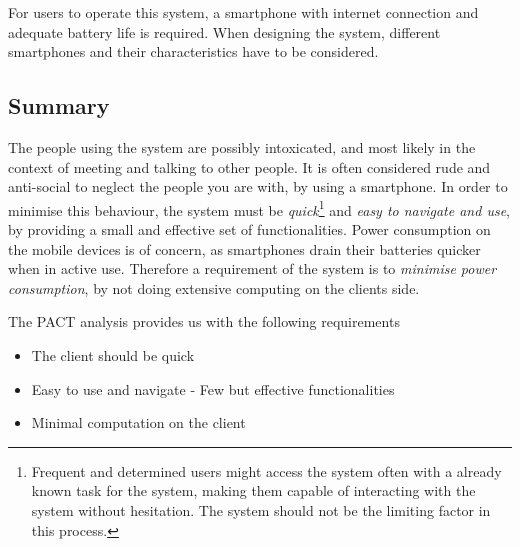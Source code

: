 For users to operate this system, a smartphone with internet connection and adequate battery life is required. When designing the system, different smartphones and their characteristics have to be considered.

\subsection{Summary}
\label{sec:pact_summary}

The people using the system are possibly intoxicated, and most likely in the context of meeting and talking to other people. It is often considered rude and anti-social to neglect the people you are with, by using a smartphone. In order to minimise this behaviour, the system must be \textit{quick}\footnote{Frequent and determined users might access the system often with a already known task for the system, making them capable of interacting with the system without hesitation. The system should not be the limiting factor in this process.} and \textit{easy to navigate and use}, by providing a small and effective set of functionalities.
Power consumption on the mobile devices is of concern, as smartphones drain their batteries quicker when in active use. Therefore a requirement of the system is to \textit{minimise power consumption}, by not doing extensive computing on the clients side.


The PACT analysis provides us with the following requirements
\begin{itemize}
  \item The client should be quick
  \item Easy to use and navigate - Few but effective functionalities
  \item Minimal computation on the client
\end{itemize}
